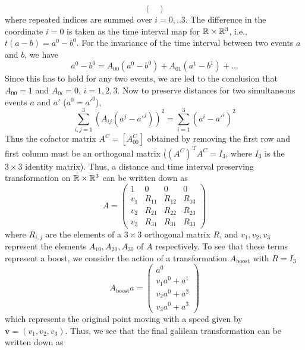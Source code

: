 \begin{enumerate}
\begin{equation}
\begin{pmatrix}
	\end{pmatrix}
	\end{equation}
where repeated indices are summed over $i = 0,..3$. The difference in the coordinate $i = 0$ is taken as the time interval map for $\mathbb{R} \times \mathbb{R}^3$, i.e., $t(a-b) = a^0-b^0$. For the invariance of the time interval between two events $a$ and $b$, we have
\begin{equation}
a^0-b^0 = A_{00}(a^0-b^0) + A_{01}(a^1-b^1)+...
\end{equation}
Since this has to hold for any two events, we are led to the conclusion that $A_{00} = 1$ and $A_{0i} = 0$, $ i = 1,2,3$. Now to preserve distances for two simultaneous events $a$ and $a'$ ($a^0 = a'^0$),
\begin{equation}\label{key}
	\sum_{i,j=1}^3 (A_{ij}(a^j-a'^j))^2 = 	\sum_{i=1}^3 (a^i-a'^i)^2
\end{equation}
Thus the cofactor matrix $A^C = [A^C_{00}]$ obtained by removing the first row and first column must be an orthogonal matrix ($(A^{C})^{\mathrm{T}}A^C = I_3 $, where $I_3$ is the $3\times3$ identity matrix). Thus, a distance and time interval preserving transformation on $\mathbb{R}\times \mathbb{R}^3$ can be written down as 
\begin{equation}\label{genA}
	A = \begin{pmatrix}
		1 & 0 & 0 & 0\\
		v_1&R_{11}& R_{12}& R_{13}\\
		v_2&R_{21}&R_{22} &R_{23} \\
		v_3&R_{31}& R_{31}& R_{33}
		\end{pmatrix}
\end{equation}
where $R_{i,j}$ are the elements of a $3\times 3$ orthogonal matrix $R$, and $v_1, v_2, v_3$ represent the elements $A_{10}, A_{20}, A_{30}$ of $A$ respectively. To see that these terms represent a boost, we consider the action of a transformation $ A_{\mathrm{boost}} $ with $R=I_3$
\begin{equation}\label{key}
	A_{\mathrm{boost}} a = \begin{pmatrix}
			a^0\\
			v_1 a^0 + a^1\\
			v_2 a^0 + a^2\\
			v_3 a^0 + a^3	
		\end{pmatrix}
\end{equation}
which represents the original point moving with a speed given by $\mathbf{v} = (v_1, v_2, v_3)$. Thus, we see that the final galilean transformation can be written down as 

\end{enumerate}
